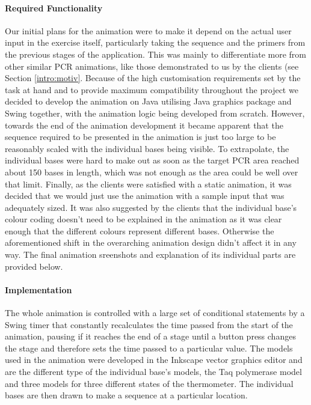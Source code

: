 \paragraph{Required Functionality}
Our initial plans for the animation were to make it depend on the actual user input in the exercise itself, particularly taking the sequence and the primers from the previous stages of the application. This was mainly to differentiate more from other similar PCR animations, like those demonstrated to us by the clients (see Section \ref{intro:motiv}. Because of the high customisation requirements set by the task at hand and to provide maximum compatibility throughout the project we decided to develop the animation on Java utilising Java graphics package and Swing together, with the animation logic being developed from scratch. However, towards the end of the animation development it became apparent that the sequence required to be presented in the animation is just too large to be reasonably scaled with the individual bases being visible. To extrapolate, the individual bases were hard to make out as soon as the target PCR area reached about 150 bases in length, which was not enough as the area could be well over that limit. Finally, as the clients were satisfied with a static animation, it was decided that we would just use the animation with a sample input that  was adequately sized. It was also suggested by the clients that the individual base's colour coding doesn't need to be explained in the animation as it was clear enough that the different colours represent different bases. Otherwise the aforementioned shift in the overarching animation design didn't affect it in any way. The final animation sreenshots and explanation of its individual parts are provided below.

\paragraph{Implementation}
The whole animation is controlled with a large set of conditional statements by a Swing timer that constantly recalculates the time passed from the start of the animation, pausing if it reaches the end of a stage until a button press changes the stage and therefore sets the time passed to a particular value. The models used in the animation were developed in the Inkscape vector graphics editor and are the different type of the individual base's models, the Taq polymerase model and three models for three different states of the thermometer. The individual bases are then drawn to make a sequence at a particular location.


